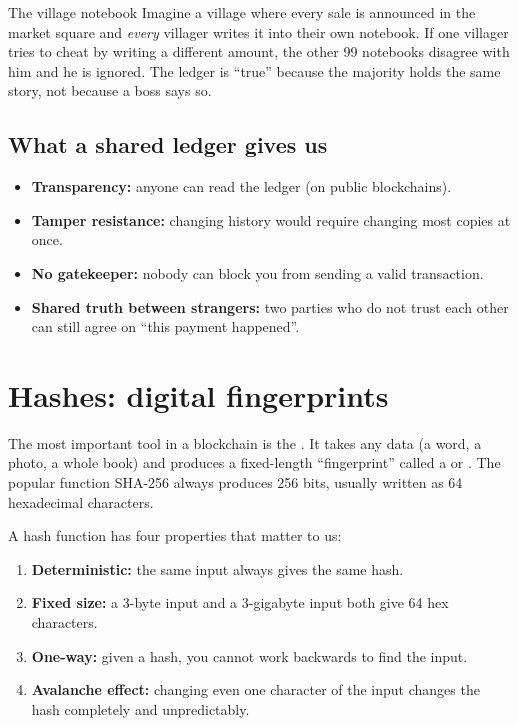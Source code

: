 \begin{analogybox}{The village notebook}
Imagine a village where every sale is announced in the market square and \emph{every} villager writes it into their own notebook. If one villager tries to cheat by writing a different amount, the other 99 notebooks disagree with him and he is ignored. The ledger is ``true'' because the majority holds the same story, not because a boss says so.
\end{analogybox}

\subsection{What a shared ledger gives us}
\begin{itemize}
  \item \textbf{Transparency:} anyone can read the ledger (on public blockchains).
  \item \textbf{Tamper resistance:} changing history would require changing most copies at once.
  \item \textbf{No gatekeeper:} nobody can block you from sending a valid transaction.
  \item \textbf{Shared truth between strangers:} two parties who do not trust each other can still agree on ``this payment happened''.
\end{itemize}

\section{Hashes: digital fingerprints}

The most important tool in a blockchain is the . It takes any data (a word, a photo, a whole book) and produces a fixed-length ``fingerprint'' called a  or . The popular function SHA-256 always produces 256 bits, usually written as 64 hexadecimal characters.

A hash function has four properties that matter to us:
\begin{enumerate}
  \item \textbf{Deterministic:} the same input always gives the same hash.
  \item \textbf{Fixed size:} a 3-byte input and a 3-gigabyte input both give 64 hex characters.
  \item \textbf{One-way:} given a hash, you cannot work backwards to find the input.
  \item \textbf{Avalanche effect:} changing even one character of the input changes the hash completely and unpredictably.
\end{enumerate}

